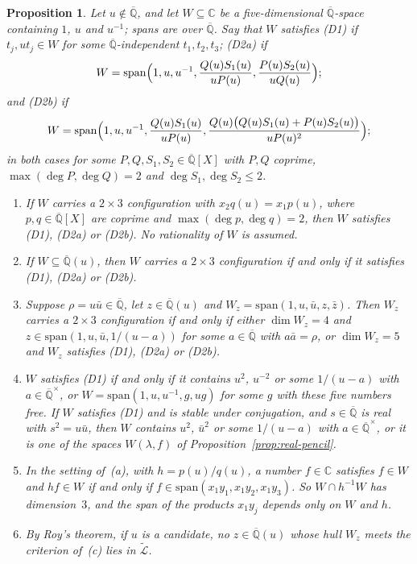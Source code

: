\documentclass[11pt,a4paper]{article}
\theoremstyle{plain}
\newtheorem{proposition}[theorem]{Proposition}
\theoremstyle{definition}
\newcommand{\C}{\mathbb{C}}
\newcommand{\Alg}{\overline{\mathbb{Q}}}
\newcommand{\aLogs}{\widetilde{\mathcal{L}}}
\begin{document}
\begin{proposition}\label{prop:rational-hulls}
Let $u\notin\Alg$, and let $W\subseteq\C$ be a five-dimensional $\Alg$-space containing $1$, $u$ and $u^{-1}$; spans
are over $\Alg$. Say that $W$ satisfies (D1) if $t_{j},ut_{j}\in W$ for some $\Alg$-independent $t_{1},t_{2},t_{3}$;
(D2a) if
\[
  W=\mathrm{span}\Bigl(1,u,u^{-1},\frac{Q(u)S_{1}(u)}{uP(u)},\frac{P(u)S_{2}(u)}{uQ(u)}\Bigr);
\]
and (D2b) if
\[
  W=\mathrm{span}\Bigl(1,u,u^{-1},\frac{Q(u)S_{1}(u)}{uP(u)},
  \frac{Q(u)\bigl(Q(u)S_{1}(u)+P(u)S_{2}(u)\bigr)}{uP(u)^{2}}\Bigr);
\]
in both cases for some $P,Q,S_{1},S_{2}\in\Alg[X]$ with $P,Q$ coprime, $\max(\deg P,\deg Q)=2$ and
$\deg S_{1},\deg S_{2}\le2$.
\begin{enumerate}[label=\textup{(\alph*)}]
\item If $W$ carries a $2\times3$ configuration with $x_{2}q(u)=x_{1}p(u)$, where $p,q\in\Alg[X]$ are coprime and
$\max(\deg p,\deg q)=2$, then $W$ satisfies (D1), (D2a) or (D2b). No rationality of $W$ is assumed.
\item If $W\subseteq\Alg(u)$, then $W$ carries a $2\times3$ configuration if and only if it satisfies (D1), (D2a) or
(D2b).
\item Suppose $\rho=u\bar u\in\Alg$, let $z\in\Alg(u)$ and $W_{z}=\mathrm{span}(1,u,\bar u,z,\bar z)$. Then $W_{z}$
carries a $2\times3$ configuration if and only if either $\dim W_{z}=4$ and $z\in\mathrm{span}(1,u,\bar u,1/(u-a))$
for some $a\in\Alg$ with $a\bar a=\rho$, or $\dim W_{z}=5$ and $W_{z}$ satisfies (D1), (D2a) or (D2b).
\item $W$ satisfies (D1) if and only if it contains $u^{2}$, $u^{-2}$ or some $1/(u-a)$ with $a\in\Alg^{\times}$, or
$W=\mathrm{span}(1,u,u^{-1},g,ug)$ for some $g$ with these five numbers free. If $W$ satisfies (D1) and is stable
under conjugation, and $s\in\Alg$ is real with $s^{2}=u\bar u$, then $W$ contains $u^{2}$, $\bar u^{2}$ or some
$1/(u-a)$ with $a\in\Alg^{\times}$, or it is one of the spaces $W(\lambda,f)$ of Proposition~\ref{prop:real-pencil}.
\item In the setting of~(a), with $h=p(u)/q(u)$, a number $f\in\C$ satisfies $f\in W$ and $hf\in W$ if and only if
$f\in\mathrm{span}(x_{1}y_{1},x_{1}y_{2},x_{1}y_{3})$. So $W\cap h^{-1}W$ has dimension~$3$, and the span of the
products $x_{1}y_{j}$ depends only on $W$ and $h$.
\item By Roy's theorem, if $u$ is a candidate, no $z\in\Alg(u)$ whose hull $W_{z}$ meets the criterion of~(c)
lies in $\aLogs$.
\end{enumerate}
\end{proposition}
\end{document}
